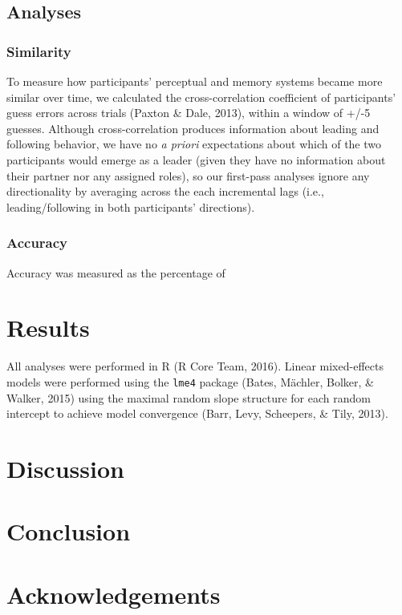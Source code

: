 \documentclass[10pt, letterpaper]{article}
\begin{document}
\subsection{Analyses}\label{analyses}

\subsubsection{Similarity}\label{similarity}

To measure how participants' perceptual and memory systems became more
similar over time, we calculated the cross-correlation coefficient of
participants' guess errors across trials (Paxton \& Dale, 2013), within
a window of +/-5 guesses. Although cross-correlation produces
information about leading and following behavior, we have no \emph{a
priori} expectations about which of the two participants would emerge as
a leader (given they have no information about their partner nor any
assigned roles), so our first-pass analyses ignore any directionality by
averaging across the each incremental lags (i.e., leading/following in
both participants' directions).

\subsubsection{Accuracy}\label{accuracy}

Accuracy was measured as the percentage of

\section{Results}\label{results}

All analyses were performed in R (R Core Team, 2016). Linear
mixed-effects models were performed using the \texttt{lme4} package
(Bates, Mächler, Bolker, \& Walker, 2015) using the maximal random slope
structure for each random intercept to achieve model convergence (Barr,
Levy, Scheepers, \& Tily, 2013).

\section{Discussion}\label{discussion}

\section{Conclusion}\label{conclusion}

\section{Acknowledgements}\label{acknowledgements}
\end{document}
